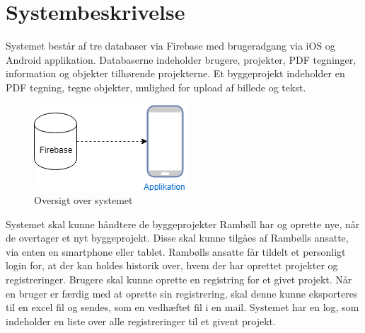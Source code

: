 \chapter{Systembeskrivelse}
	Systemet består af tre databaser via Firebase med brugeradgang via iOS og Android applikation.
	Databaserne indeholder brugere, projekter, PDF tegninger, information og objekter tilhørende projekterne.
	Et byggeprojekt indeholder en PDF tegning, tegne objekter, mulighed for upload af billede og tekst. \\
	
	\begin{figure}[H]
		\centering
		\includegraphics[width=0.4\linewidth]{Systembeskrivelse/Oversigtoversystem}
		\caption{Oversigt over systemet}
		\label{fig:OversigtSystembeskrivelse}
	\end{figure}
	
	Systemet skal kunne håndtere de byggeprojekter Rambøll har og oprette nye, når de overtager et nyt byggeprojekt.
	Disse skal kunne tilgåes af Rambølls ansatte, via enten en smartphone eller tablet.
	Rambølls ansatte får tildelt et personligt login for, at der kan holdes historik over, hvem der har oprettet projekter og registreringer.
	Brugere skal kunne oprette en registring for et givet projekt.
	Når en bruger er færdig med at oprette sin registrering, skal denne kunne eksporteres til en excel fil og sendes, som en vedhæftet fil i en mail.
	Systemet har en log, som indeholder en liste over alle registreringer til et givent projekt. \\	
				 
	\clearpage